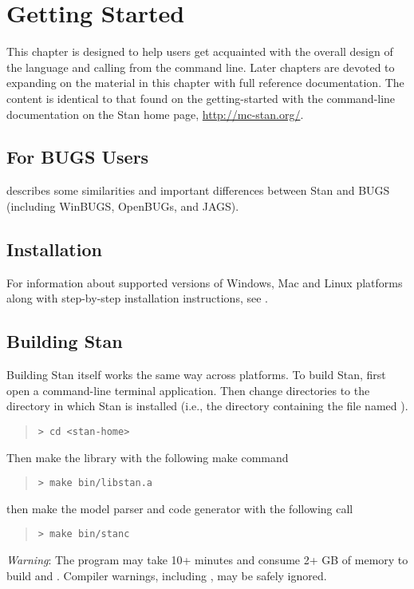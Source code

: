 \chapter{Getting Started}

\noindent
This chapter is designed to help users get acquainted with the overall
design of the \Stan language and calling \Stan from the command line.
Later chapters are devoted to expanding on the material in this
chapter with full reference documentation.  The content is identical
to that found on the getting-started with the command-line
documentation on the Stan home page, \url{http://mc-stan.org/}.

\section{For BUGS Users}

 describes some similarities
and important differences between Stan and BUGS (including WinBUGS,
OpenBUGs, and JAGS).


\section{Installation}

For information about supported versions of Windows, Mac and Linux
platforms along with step-by-step installation instructions, see
.

\section{Building Stan}

Building Stan itself works the same way across platforms.
To build Stan, first open a command-line terminal application.  Then change
directories to the directory in which Stan is installed (i.e., the
directory containing the file named ).
%
\begin{quote}
\begin{Verbatim}[fontshape=sl,fontsize=\small] 
> cd <stan-home>
\end{Verbatim}
\end{quote}
%
Then make the library with the following make command
%
\begin{quote}
\begin{Verbatim}[fontshape=sl,fontsize=\small]
> make bin/libstan.a
\end{Verbatim}
\end{quote}
%
then make the model parser and code generator with the following call
%
\begin{quote}
\begin{Verbatim}[fontshape=sl,fontsize=\small]
> make bin/stanc
\end{Verbatim}
\end{quote}
%
\emph{Warning}: The  program may take 10+ minutes and
consume 2+ GB of memory to build  and .
Compiler warnings, including , may be safely ignored.
 
